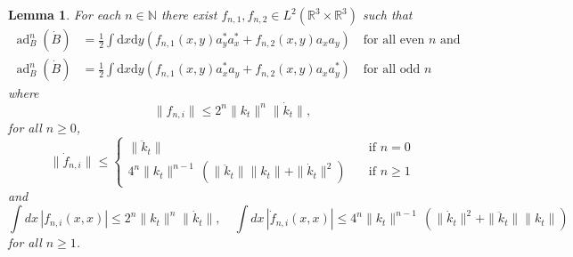 \documentclass[11pt,a4paper,DIV11]{scrartcl}	%
\newtheorem{lem}[thm]{Lemma}
\newcommand{\ad}{\operatorname{ad}}	%
\newcommand{\di}{\textrm{d}}		%
\newcommand{\Rbb}{\mathbb{R}}		%
\newcommand{\Nbb}{\mathbb{N}}		%
\newcommand{\norm}[1]{\lVert#1\rVert}	%
\begin{document}
\begin{lem}
\label{lm:highercommutators}
 For each $n \in \Nbb$ there exist $f_{n,1}, f_{n,2} \in L^2(\Rbb^3 \times \Rbb^3)$ such that
\begin{equation}\label{eq:adnBB} \begin{split}
\ad^n_B(\dot B) &= \frac{1}{2} \int \di x\di y\left( f_{n,1}(x,y) a^\ast_y a^\ast_x + f_{n,2}(x,y) a_x a_y \right) \quad \text{for all even $n$ and }\\
\ad^n_B(\dot B) &= \frac{1}{2} \int \di x\di y\left( f_{n,1}(x,y) a^\ast_x a_y + f_{n,2}(x,y) a_x a^\ast_y \right) \quad \text{for all odd $n$}
\end{split} \end{equation}
where \begin{equation}\label{eq:est-fn}  \| f_{n,i} \|  \leq 2^n \norm{k_t}^n \| \dot{k}_t \| , 
\end{equation}
for all $n \geq 0$, 
\begin{equation}\label{eq:est-dotfn}
\| \dot{f}_{n,i} \| \leq \left\{ \begin{array}{ll} \| \ddot k_t \| \quad & \text{if } n = 0 \\ 
4^n \| k_t \|^{n-1} \, \left( \| \ddot{k}_t \|  \| k_t \| + \|\dot{k}_t \|^{2} \right) \quad & \text{if } n \geq 1 \end{array} \right. 
\end{equation}
and
\begin{equation}\label{eq:est-fn2} \int dx  \, |f_{n,i} (x,x)|  \leq  2^n \norm{k_t}^n \| \dot{k}_t \| , \quad \int dx \, | \dot{f}_{n,i} (x,x)| \leq  4^n \| k_t \|^{n-1} \, \left( \| \dot{k}_t \|^2 + \| \ddot{k}_t \| \| k_t \|\right)
\end{equation}
for all $n \geq 1$.  
\end{lem}
\end{document}
